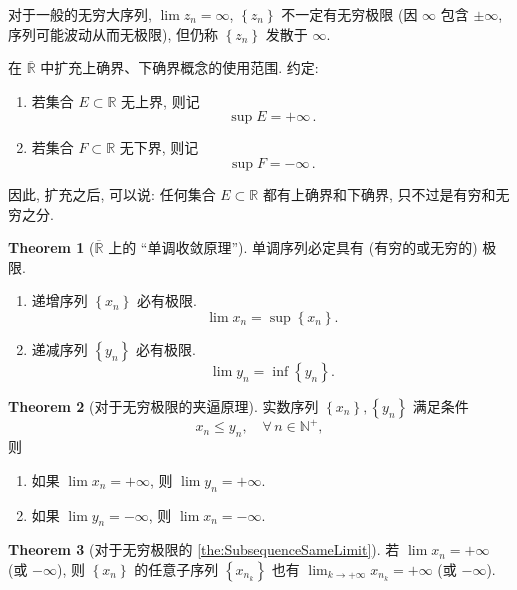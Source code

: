 \documentclass{book}
\newcommand{\Any}{\forall\,}
\newcommand{\set}[1]{\left\{#1\right\}}
\newcommand{\exR}{\overline{\mathbb{R}}}
\newcommand{\R}{\mathbb{R}}
\newcommand{\N}{\mathbb{N}}
\renewcommand{\le}{\leqslant}
\numberwithin{equation}{section}
\numberwithin{figure}{section}
\theoremstyle{definition}
\newtheorem{theorem}{Theorem}[section]
\begin{document}
对于一般的无穷大序列, $\lim z_n=\infty$, $\set{z_n}$ 不一定有无穷极限 (因 $\infty$ 包含 $\pm\infty$, 序列可能波动从而无极限), 但仍称 $\set{z_n}$ 发散于 $\infty$.

在 $\exR$ 中扩充上确界、下确界概念的使用范围. 约定:
\begin{enumerate}
  \item 若集合 $E\subset\R$ 无上界, 则记
    \begin{equation*}
      \sup E=+\infty\,.
    \end{equation*}
  \item 若集合 $F\subset\R$ 无下界, 则记
    \begin{equation*}
      \sup F=-\infty\,.
    \end{equation*}
\end{enumerate}
因此, 扩充之后, 可以说: 任何集合 $E\subset\R$ 都有上确界和下确界, 只不过是有穷和无穷之分.

\begin{theorem}[$\exR$ 上的 ``单调收敛原理'']
  \leavevmode

  单调序列必定具有 (有穷的或无穷的) 极限.
  \begin{enumerate}
    \item 递增序列 $\set{x_n}$ 必有极限.
      \begin{equation*}
	\lim x_n=\sup\set{x_n}.
      \end{equation*}
    \item 递减序列 $\set{y_n}$ 必有极限.
      \begin{equation*}
	\lim y_n=\inf\set{y_n}.
      \end{equation*}
  \end{enumerate}
\end{theorem}

\begin{theorem}[对于无穷极限的夹逼原理]
  \leavevmode

  实数序列 $\set{x_n},\set{y_n}$ 满足条件
  \begin{equation*}
    x_n\le y_n,\quad\Any n\in\N^+,
  \end{equation*}
  则
  \begin{enumerate}
    \item 如果 $\lim x_n=+\infty$, 则 $\lim y_n=+\infty$.
    \item 如果 $\lim y_n=-\infty$, 则 $\lim x_n=-\infty$.
  \end{enumerate}
\end{theorem}

\begin{theorem}[对于无穷极限的 \cref{the:SubsequenceSameLimit}]
  \leavevmode

  若 $\lim x_n=+\infty$ (或 $-\infty$), 则 $\set{x_n}$ 的任意子序列 $\set{x_{n_k}}$ 也有 $\lim_{k\to+\infty}x_{n_k}=+\infty$ (或 $-\infty$).
\end{theorem}
\end{document}
